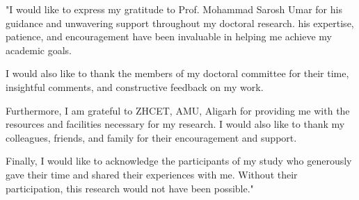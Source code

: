 \par "I would like to express my gratitude to Prof. Mohammad Sarosh Umar for his guidance and unwavering support throughout my doctoral research. his expertise, patience, and encouragement have been invaluable in helping me achieve my academic goals.

\par I would also like to thank the members of my doctoral committee for their time, insightful comments, and constructive feedback on my work.

\par Furthermore, I am grateful to ZHCET, AMU, Aligarh for providing me with the resources and facilities necessary for my research. I would also like to thank my colleagues, friends, and family for their encouragement and support.

\par Finally, I would like to acknowledge the participants of my study who generously gave their time and shared their experiences with me. Without their participation, this research would not have been possible."
